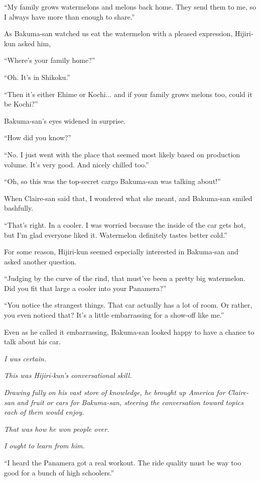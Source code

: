 \documentclass[
    a4paper,
    12pt,
    twoside,
    openany,
    UTF8,
    fontset=windows
]{ctexbook}
\begin{document}
``My family grows watermelons and melons back home. They send them to me, so I always have more than enough to share.''

As Bakuma-san watched us eat the watermelon with a pleased expression, Hijiri-kun asked him,

``Where's your family home?''

``Oh. It's in Shikoku.''

``Then it's either Ehime or Kochi... and if your family grows melons too, could it be Kochi?''

Bakuma-san's eyes widened in surprise.

``How did you know?''

``No. I just went with the place that seemed most likely based on production volume. It's very good. And nicely chilled too.''

``Oh, so this was the top-secret cargo Bakuma-san was talking about!''

When Claire-san said that, I wondered what she meant, and Bakuma-san smiled bashfully.

``That's right. In a cooler. I was worried because the inside of the car gets hot, but I'm glad everyone liked it. Watermelon definitely tastes better cold.''

For some reason, Hijiri-kun seemed especially interested in Bakuma-san and asked another question.

``Judging by the curve of the rind, that must've been a pretty big watermelon. Did you fit that large a cooler into your Panamera?''

``You notice the strangest things. That car actually has a lot of room. Or rather, you even noticed that? It's a little embarrassing for a show-off like me.''

Even as he called it embarrassing, Bakuma-san looked happy to have a chance to talk about his car.

\textit{I was certain.}

\textit{This was Hijiri-kun's conversational skill.}

\textit{Drawing fully on his vast store of knowledge, he brought up America for Claire-san and fruit or cars for Bakuma-san, steering the conversation toward topics each of them would enjoy.}

\textit{That was how he won people over.}

\textit{I ought to learn from him.}

``I heard the Panamera got a real workout. The ride quality must be way too good for a bunch of high schoolers.''
\end{document}
